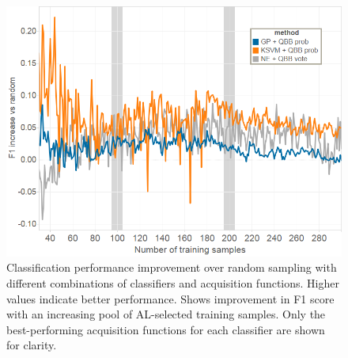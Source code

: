 \documentclass{sig-alternate}
\begin{document}
\begin{figure}[tb]
\centering
\includegraphics[width=\linewidth]{classification_experiment}
\caption{Classification performance improvement over random sampling with different combinations of classifiers and acquisition functions.
Higher values indicate better performance.
Shows improvement in F1 score with an increasing pool of AL-selected training samples.
Only the best-performing acquisition functions for each classifier are shown for clarity.
}
\label{fig:cls_all}
\end{figure}
\end{document}
